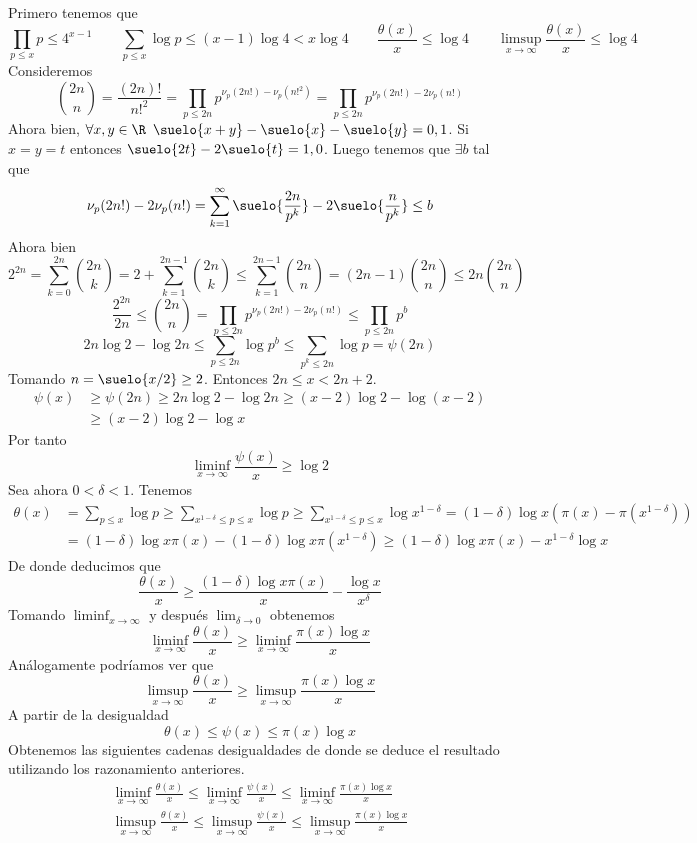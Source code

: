 \documentclass[TAN.tex]{subfiles}
\begin{document}
\begin{dem}
Primero tenemos que
$$
\prod_{p\leq x}p\leq 4^{x-1} \qquad \sum_{p\leq x}\log p\leq (x-1)\log 4 <  x \log 4 \qquad \frac{\theta(x)}{x} \leq \log 4 \qquad \limsup_{x\to\infty} \frac{\theta(x)}{x} \leq \log 4
$$
Consideremos 
$$
\binom{2n}{n} =  \frac{(2n)!}{n!^2} = \prod_{p\leq 2n} p^{\nu_p(2n!)-\nu_p(n!^2)} = \prod_{p\leq 2n} p^{\nu_p(2n!)-2\nu_p(n!)}
$$
Ahora bien, $\forall x,y \in \R$ $\suelo{x+y}-\suelo{x}-\suelo{y}=0,1$. Si $x=y=t$ entonces $\suelo{2t}-2\suelo{t}=1,0$. Luego tenemos que $\exists b$ tal que
$$
\nu_p(2n!)-2\nu_p(n!) = \sum_{k=1}^\infty \suelo{\frac{2n}{p^k}}-2\suelo{\frac{n}{p^k}}  \leq b
$$
Ahora bien 
$$
2^{2n}=\sum_{k=0}^{2n} \binom{2n}{k} = 2 + \sum_{k=1}^{2n-1} \binom{2n}{k} \leq \sum_{k=1}^{2n-1} \binom{2n}{n} = (2n-1)\binom{2n}{n} \leq 2n\binom{2n}{n} 
$$
$$
 \frac{2^{2n}}{2n} \leq \binom{2n}{n} =  \prod_{p\leq 2n} p^{\nu_p(2n!)-2\nu_p(n!)} \leq \prod_{p\leq 2n} p^b $$
 $$
  2n\log 2 -\log 2n \leq \sum_{p\leq 2n}\log p^b \leq \sum_{p^k\leq 2n}\log p= \psi(2n)
$$
Tomando $n=\suelo{x/2}\geq 2$. Entonces $2n\leq x < 2n+2$.
\begin{align*}
\psi(x)&\geq \psi(2n) \geq 2n\log 2-\log 2n \geq (x-2)\log 2-\log (x-2)\\
&\geq (x-2)\log 2 - \log x
\end{align*}
Por tanto
$$
\liminf_{x\to\infty} \frac{\psi(x)}{x}\geq \log 2
$$
Sea ahora $0<\delta < 1$. Tenemos
\begin{align*}
\theta(x)&=\sum_{p\leq x}\log p\geq\sum_{x^{1-\delta}\leq p\leq x} \log p \geq \sum_{x^{1-\delta}\leq p\leq x}\log x^{1-\delta}  = (1-\delta)\log x(\pi(x)-\pi(x^{1-\delta}))\\
&=(1-\delta)\log x\pi(x)-(1-\delta)\log x \pi(x^{1-\delta}) \geq (1-\delta)\log x \pi(x)- x^{1-\delta}\log x
\end{align*}
De donde deducimos que
$$
\frac{\theta(x)}{x} \geq \frac{(1-\delta)\log x \pi(x)}{x}-\frac{\log x}{x^{\delta}}
$$
Tomando $\liminf_{x\to\infty}$ y después $\lim_{\delta \to 0}$ obtenemos
$$
\liminf_{x\to\infty}\frac{\theta(x)}{x}\geq \liminf_{x\to\infty}\frac{\pi(x)\log x}{x}
$$
Análogamente podríamos ver que
$$
\limsup_{x\to\infty}\frac{\theta(x)}{x}\geq \limsup_{x\to\infty}\frac{\pi(x)\log x}{x}
$$
A partir de la desigualdad
$$
\theta(x)\leq \psi(x) \leq \pi(x)\log x 
$$
Obtenemos las siguientes cadenas desigualdades de donde se deduce el resultado utilizando los razonamiento anteriores.
\begin{gather*}
\liminf_{x\to\infty} \frac{\theta(x)}{x} \leq \liminf_{x\to\infty} \frac{\psi(x)}{x} \leq \liminf_{x\to\infty}\frac{\pi(x)\log x}{x}\\
\limsup_{x\to\infty} \frac{\theta(x)}{x} \leq \limsup_{x\to\infty} \frac{\psi(x)}{x} \leq \limsup_{x\to\infty}\frac{\pi(x)\log x}{x}
\end{gather*}
\end{dem}
\newpage
\end{document}
